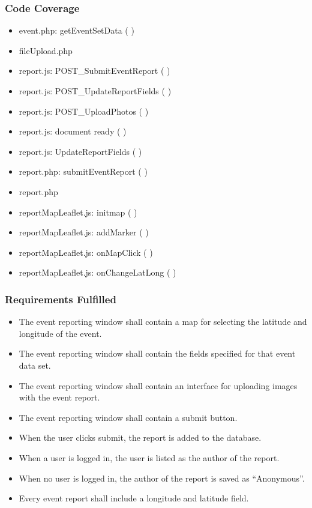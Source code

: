 \subsubsection{Code Coverage}
\begin{itemize}
\item event.php: getEventSetData ( )
\item fileUpload.php
\item report.js: POST\_SubmitEventReport ( )
\item report.js: POST\_UpdateReportFields ( )
\item report.js: POST\_UploadPhotos ( )
\item report.js: document ready ( )
\item report.js: UpdateReportFields ( )
\item report.php: submitEventReport ( )
\item report.php
\item reportMapLeaflet.js: initmap ( )
\item reportMapLeaflet.js: addMarker ( )
\item reportMapLeaflet.js: onMapClick ( )
\item reportMapLeaflet.js: onChangeLatLong ( )
\end{itemize}
\subsubsection{Requirements Fulfilled}
\begin{itemize}
\item The event reporting window shall contain a map for selecting the latitude and longitude of the event.
\item The event reporting window shall contain the fields specified for that event data set.
\item The event reporting window shall contain an interface for uploading images with the event report.
\item The event reporting window shall contain a submit button.
\item When the user clicks submit, the report is added to the database.
\item When a user is logged in, the user is listed as the author of the report.
\item When no user is logged in, the author of the report is saved as ``Anonymous''.
\item Every event report shall include a longitude and latitude field.
\end{itemize}

